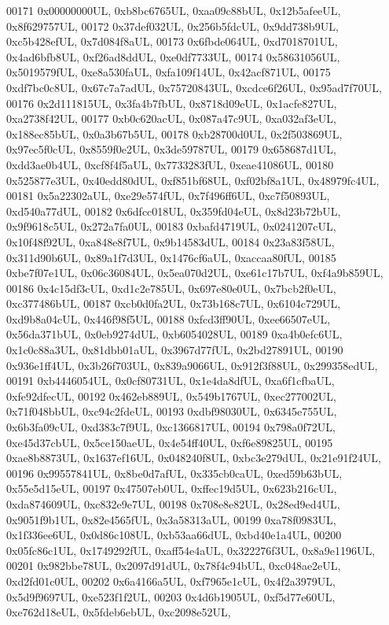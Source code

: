 \begin{DoxyCode}
00171     0x00000000UL, 0xb8bc6765UL, 0xaa09c88bUL, 0x12b5afeeUL, 0x8f629757UL,
00172     0x37def032UL, 0x256b5fdcUL, 0x9dd738b9UL, 0xc5b428efUL, 0x7d084f8aUL,
00173     0x6fbde064UL, 0xd7018701UL, 0x4ad6bfb8UL, 0xf26ad8ddUL, 0xe0df7733UL,
00174     0x58631056UL, 0x5019579fUL, 0xe8a530faUL, 0xfa109f14UL, 0x42acf871UL,
00175     0xdf7bc0c8UL, 0x67c7a7adUL, 0x75720843UL, 0xcdce6f26UL, 0x95ad7f70UL,
00176     0x2d111815UL, 0x3fa4b7fbUL, 0x8718d09eUL, 0x1acfe827UL, 0xa2738f42UL,
00177     0xb0c620acUL, 0x087a47c9UL, 0xa032af3eUL, 0x188ec85bUL, 0x0a3b67b5UL,
00178     0xb28700d0UL, 0x2f503869UL, 0x97ec5f0cUL, 0x8559f0e2UL, 0x3de59787UL,
00179     0x658687d1UL, 0xdd3ae0b4UL, 0xcf8f4f5aUL, 0x7733283fUL, 0xeae41086UL,
00180     0x525877e3UL, 0x40edd80dUL, 0xf851bf68UL, 0xf02bf8a1UL, 0x48979fc4UL,
00181     0x5a22302aUL, 0xe29e574fUL, 0x7f496ff6UL, 0xc7f50893UL, 0xd540a77dUL,
00182     0x6dfcc018UL, 0x359fd04eUL, 0x8d23b72bUL, 0x9f9618c5UL, 0x272a7fa0UL,
00183     0xbafd4719UL, 0x0241207cUL, 0x10f48f92UL, 0xa848e8f7UL, 0x9b14583dUL,
00184     0x23a83f58UL, 0x311d90b6UL, 0x89a1f7d3UL, 0x1476cf6aUL, 0xaccaa80fUL,
00185     0xbe7f07e1UL, 0x06c36084UL, 0x5ea070d2UL, 0xe61c17b7UL, 0xf4a9b859UL,
00186     0x4c15df3cUL, 0xd1c2e785UL, 0x697e80e0UL, 0x7bcb2f0eUL, 0xc377486bUL,
00187     0xcb0d0fa2UL, 0x73b168c7UL, 0x6104c729UL, 0xd9b8a04cUL, 0x446f98f5UL,
00188     0xfcd3ff90UL, 0xee66507eUL, 0x56da371bUL, 0x0eb9274dUL, 0xb6054028UL,
00189     0xa4b0efc6UL, 0x1c0c88a3UL, 0x81dbb01aUL, 0x3967d77fUL, 0x2bd27891UL,
00190     0x936e1ff4UL, 0x3b26f703UL, 0x839a9066UL, 0x912f3f88UL, 0x299358edUL,
00191     0xb4446054UL, 0x0cf80731UL, 0x1e4da8dfUL, 0xa6f1cfbaUL, 0xfe92dfecUL,
00192     0x462eb889UL, 0x549b1767UL, 0xec277002UL, 0x71f048bbUL, 0xc94c2fdeUL,
00193     0xdbf98030UL, 0x6345e755UL, 0x6b3fa09cUL, 0xd383c7f9UL, 0xc1366817UL,
00194     0x798a0f72UL, 0xe45d37cbUL, 0x5ce150aeUL, 0x4e54ff40UL, 0xf6e89825UL,
00195     0xae8b8873UL, 0x1637ef16UL, 0x048240f8UL, 0xbc3e279dUL, 0x21e91f24UL,
00196     0x99557841UL, 0x8be0d7afUL, 0x335cb0caUL, 0xed59b63bUL, 0x55e5d15eUL,
00197     0x47507eb0UL, 0xffec19d5UL, 0x623b216cUL, 0xda874609UL, 0xc832e9e7UL,
00198     0x708e8e82UL, 0x28ed9ed4UL, 0x9051f9b1UL, 0x82e4565fUL, 0x3a58313aUL,
00199     0xa78f0983UL, 0x1f336ee6UL, 0x0d86c108UL, 0xb53aa66dUL, 0xbd40e1a4UL,
00200     0x05fc86c1UL, 0x1749292fUL, 0xaff54e4aUL, 0x322276f3UL, 0x8a9e1196UL,
00201     0x982bbe78UL, 0x2097d91dUL, 0x78f4c94bUL, 0xc048ae2eUL, 0xd2fd01c0UL,
00202     0x6a4166a5UL, 0xf7965e1cUL, 0x4f2a3979UL, 0x5d9f9697UL, 0xe523f1f2UL,
00203     0x4d6b1905UL, 0xf5d77e60UL, 0xe762d18eUL, 0x5fdeb6ebUL, 0xc2098e52UL,

\end{DoxyCode}
